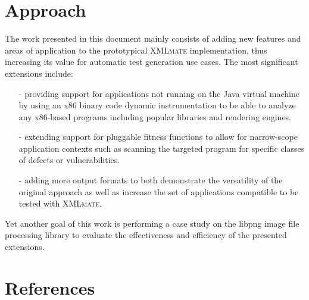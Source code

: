 \documentclass[a4paper,parskip=half]{scrartcl}
\newcommand{\java}{Java\xspace}
\newcommand{\xmlmate}{\textsc{XMLmate}\xspace}
\begin{document}

\newpage

\newpage

\newpage

\newpage
{} %
\setcounter{page}{5} %
\tableofcontents
\newpage


\section{Approach}
\label{sec:approach}
The work presented in this document mainly consists of adding new features and areas of application to the
prototypical \xmlmate implementation, thus increasing its value for automatic test generation use cases. The
most significant extensions include: 
\begin{itemize}
\item[-]providing support for applications not running on the \java virtual machine by using an x86 binary code
dynamic instrumentation to be able to analyze any x86-based programs including popular libraries and rendering
engines.
\item[-]extending support for pluggable fitness functions to allow for narrow-scope application contexts such
as scanning the targeted program for specific classes of defects or vulnerabilities.
\item[-]adding more output formats to both demonstrate the versatility of the original approach as well as
increase the set of applications compatible to be tested with \xmlmate.
\end{itemize}

Yet another goal of this work is performing a case study on the libpng image file processing library to
evaluate the effectiveness and efficiency of the presented extensions.








\newpage
\section*{References}
\renewcommand\refname{}


\end{document}
